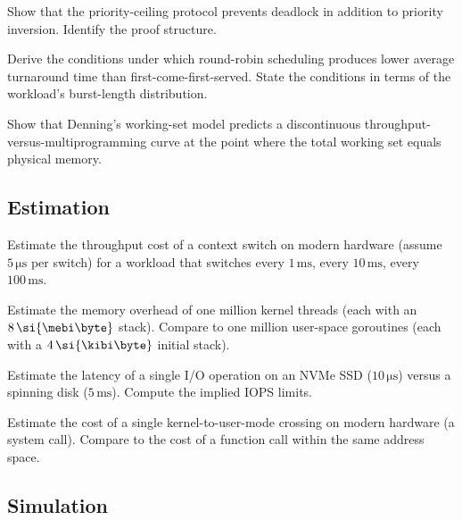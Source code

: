 \begin{exercise}
Show that the priority-ceiling protocol prevents deadlock in addition to priority inversion. Identify the proof structure.
\end{exercise}

\begin{exercise}
Derive the conditions under which round-robin scheduling produces lower average turnaround time than first-come-first-served. State the conditions in terms of the workload's burst-length distribution.
\end{exercise}

\begin{exercise}
Show that Denning's working-set model predicts a discontinuous throughput-versus-multiprogramming curve at the point where the total working set equals physical memory.
\end{exercise}

\subsection*{Estimation}

\begin{exercise}
Estimate the throughput cost of a context switch on modern hardware (assume $5\,\si{\micro\second}$ per switch) for a workload that switches every $1\,\si{\milli\second}$, every $10\,\si{\milli\second}$, every $100\,\si{\milli\second}$.
\end{exercise}

\begin{exercise}
Estimate the memory overhead of one million kernel threads (each with an $8\,\si{\mebi\byte}$ stack). Compare to one million user-space goroutines (each with a $4\,\si{\kibi\byte}$ initial stack).
\end{exercise}

\begin{exercise}
Estimate the latency of a single I/O operation on an NVMe SSD ($10\,\si{\micro\second}$) versus a spinning disk ($5\,\si{\milli\second}$). Compute the implied IOPS limits.
\end{exercise}

\begin{exercise}
Estimate the cost of a single kernel-to-user-mode crossing on modern hardware (a system call). Compare to the cost of a function call within the same address space.
\end{exercise}

\subsection*{Simulation}

